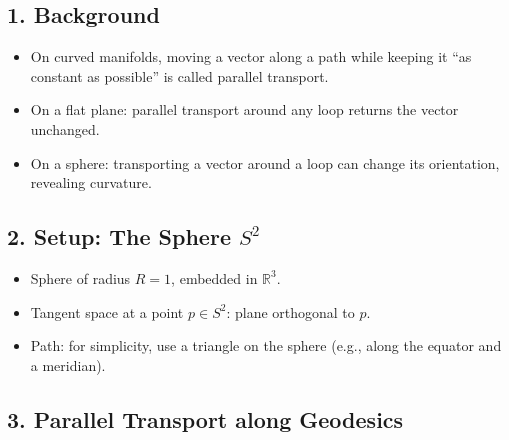 \documentclass[
  letterpaper,
  DIV=11,
  numbers=noendperiod]{scrreprt}
\providecommand{\tightlist}{%
  \setlength{\itemsep}{0pt}\setlength{\parskip}{0pt}}
\begin{document}
\subsection{1. Background}\label{background-3}

\begin{itemize}
\tightlist
\item
  On curved manifolds, moving a vector along a path while keeping it
  ``as constant as possible'' is called parallel transport.
\item
  On a flat plane: parallel transport around any loop returns the vector
  unchanged.
\item
  On a sphere: transporting a vector around a loop can change its
  orientation, revealing curvature.
\end{itemize}

\subsection{\texorpdfstring{2. Setup: The Sphere
\(S^2\)}{2. Setup: The Sphere S\^{}2}}\label{setup-the-sphere-s2}

\begin{itemize}
\tightlist
\item
  Sphere of radius \(R=1\), embedded in \(\mathbb{R}^3\).
\item
  Tangent space at a point \(p \in S^2\): plane orthogonal to \(p\).
\item
  Path: for simplicity, use a triangle on the sphere (e.g., along the
  equator and a meridian).
\end{itemize}

\subsection{3. Parallel Transport along
Geodesics}\label{parallel-transport-along-geodesics}
\end{document}
